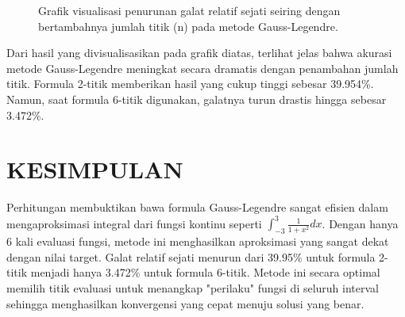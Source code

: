 \documentclass[conference]{IEEEtran}
\begin{document}
\begin{figure}[htbp]
\centering
{}
\caption{Grafik visualisasi penurunan galat relatif sejati seiring dengan bertambahnya jumlah titik (n) pada metode Gauss-Legendre.}
\label{fig:grafik_galat_konvergensi}
\end{figure}

Dari hasil yang divisualisasikan pada grafik diatas, terlihat jelas bahwa akurasi metode Gauss-Legendre meningkat secara dramatis dengan penambahan jumlah titik. Formula 2-titik memberikan hasil yang cukup tinggi sebesar 39.954\%. Namun, saat formula 6-titik digunakan, galatnya turun drastis hingga sebesar 3.472\%.

\section{KESIMPULAN}
Perhitungan membuktikan bawa formula Gauss-Legendre sangat efisien dalam mengaproksimasi integral dari fungsi kontinu seperti $\int_{-3}^{3} \frac{1}{1+x^2} dx$. Dengan hanya 6 kali evaluasi fungsi, metode ini menghasilkan aproksimasi yang sangat dekat dengan nilai target. Galat relatif sejati menurun dari 39.95\% untuk formula 2-titik menjadi hanya 3.472\% untuk formula 6-titik. Metode ini secara optimal memilih titik evaluasi untuk menangkap "perilaku" fungsi di seluruh interval sehingga menghasilkan konvergensi yang cepat menuju solusi yang benar.
\end{document}
